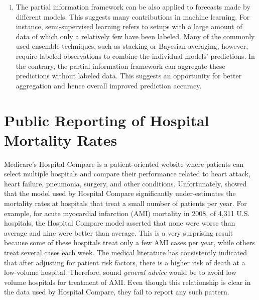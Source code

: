 \documentclass[10pt,twoside]{article}
\theoremstyle{definition}
\theoremstyle{definition}
\begin{document}
\begin{enumerate}[i)]
\item The partial information framework can be also applied to forecasts made by different models. This suggests many contributions in machine learning. For instance, semi-supervised learning refers to setups with a large amount of data of which only a relatively few have been labeled. Many of the commonly used ensemble techniques, such as stacking or Bayesian averaging, however, require labeled observations to combine the individual models' predictions. In the contrary, the partial information framework can aggregate these predictions without labeled data. This suggests an opportunity for better aggregation and hence overall improved prediction accuracy.

\end{enumerate}

 \vspace{-2em} \section{Public Reporting of Hospital Mortality Rates}   \vspace{-0.5em}
Medicare's Hospital Compare is a patient-oriented website
 where patients can select multiple hospitals and compare their performance related to heart attack, heart failure, pneumonia, surgery, and other conditions. Unfortunately, \cite{silber2010hospital} showed that the model used by Hospital Compare significantly under-estimates the mortality rates at hospitals that treat a small number of patients per year. For example, for acute myocardial infarction (AMI) mortality in 2008, of 4,311 U.S. hospitals, the Hospital Compare model asserted that none were worse than average and nine were better than average. This is a very surprising result because some of these hospitals treat only a few AMI cases per year, while others treat several cases each week. The medical literature \citep{gandjour2003threshold, halm2002volume, luft1987volume} has consistently indicated that after adjusting for patient risk factors, there is a higher risk of death at a low-volume hospital. Therefore, sound \textit{general advice} would
be to avoid low volume hospitals for treatment of AMI. Even though this relationship is clear in the data used by Hospital Compare, they fail to report any such pattern. 
\end{document}
